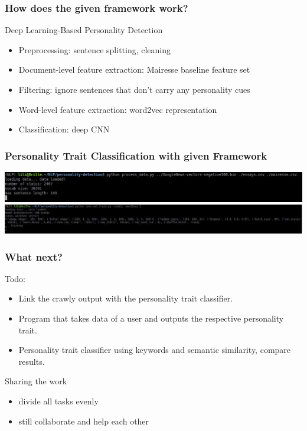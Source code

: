 \documentclass{beamer}
\begin{document}
	\begin{frame}
\frametitle{How does the given framework work?}
Deep Learning-Based Personality Detection\cite{traitpaper}
\begin{itemize}
	\item Preprocessing: sentence splitting, cleaning
	\item Document-level feature extraction: Mairesse baseline feature set
	\item Filtering: ignore sentences that don't carry any personality cues
	\item Word-level feature extraction: word2vec representation 
	\item Classification: deep CNN
\end{itemize}
\end{frame}


	\begin{frame}
		\frametitle{Personality Trait Classification with given Framework}
		\includegraphics[width=\textwidth]{pictures/output3}
		\includegraphics[width=\textwidth]{pictures/output1}		
	\end{frame}

	\begin{frame}
		\frametitle{What next?}
		Todo:
		\begin{itemize}
			\item Link the crawly output with the personality trait classifier.
			\item Program that takes data of a user and outputs the respective personality trait.
			\item Personality trait classifier using keywords and semantic similarity, compare results.
		\end{itemize}
	
		Sharing the work
		\begin{itemize}
			\item divide all tasks evenly
			\item still collaborate and help each other
		\end{itemize}
	\end{frame}
\end{document}
